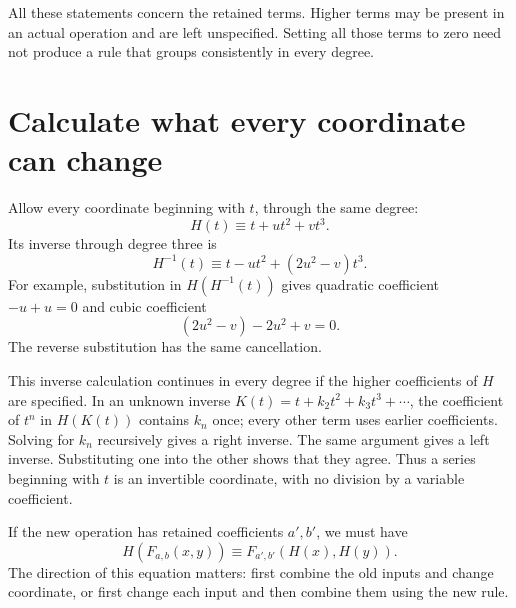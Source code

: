 \documentclass[11pt,letterpaper]{article}
\numberwithin{equation}{section}
\theoremstyle{definition}\newtheorem{example}[theorem]{Example}
\begin{document}
All these statements concern the retained terms. Higher terms may be present in an actual operation and are left unspecified. Setting all those terms to zero need not produce a rule that groups consistently in every degree.

\section{Calculate what every coordinate can change}\label{sec:coordinate-action}

Allow every coordinate beginning with \(t\), through the same degree:
\begin{equation}\label{eq:coordinate-jet}
 H(t)\equiv t+ut^2+vt^3.
\end{equation}
Its inverse through degree three is
\begin{equation}\label{eq:coordinate-inverse}
 H^{-1}(t)\equiv t-ut^2+(2u^2-v)t^3.
\end{equation}
For example, substitution in \(H(H^{-1}(t))\) gives quadratic coefficient \(-u+u=0\) and cubic coefficient
\[
 (2u^2-v)-2u^2+v=0.
\]
The reverse substitution has the same cancellation.

This inverse calculation continues in every degree if the higher coefficients of \(H\) are specified. In an unknown inverse \(K(t)=t+k_2t^2+k_3t^3+\cdots\), the coefficient of \(t^n\) in \(H(K(t))\) contains \(k_n\) once; every other term uses earlier coefficients. Solving for \(k_n\) recursively gives a right inverse. The same argument gives a left inverse. Substituting one into the other shows that they agree. Thus a series beginning with \(t\) is an invertible coordinate, with no division by a variable coefficient.

If the new operation has retained coefficients \(a',b'\), we must have
\begin{equation}\label{eq:coordinate-bridge}
 H(F_{a,b}(x,y))\equiv F_{a',b'}(H(x),H(y)).
\end{equation}
The direction of this equation matters: first combine the old inputs and change coordinate, or first change each input and then combine them using the new rule.
\end{document}
